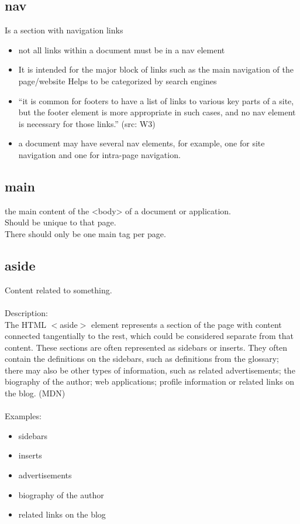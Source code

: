 \documentclass[]{article}
\newcommand{\<}{\guilsinglleft}
\renewcommand{\>}{\guilsinglright}
\begin{document}
\subsection{nav}
Is a section with navigation links
\begin{itemize}
	\item not all links within a document must be in a nav element
	
	\item It is intended for the major block of links
	\subitem such as the main navigation of the page/website
	\subitem Helps to be categorized by search engines
	
	\item “it is common for footers to have a list of links to various key parts of a site, but the footer element is more appropriate in such cases, and no nav element is necessary for those links.” (src: W3)
	
	\item a document may have several nav elements, for example, one for site navigation and one for intra-page navigation.
\end{itemize}

\subsection{main}
the main content of the <body> of a document or application.
\\
Should be unique to that page.
\\
There should only be one main tag per page.

\subsection{aside}
Content related to something.
\\\\
Description:
\\
The HTML $<$aside$>$ element represents a section of the page with content connected tangentially to the rest, which could be considered separate from that content. These sections are often represented as sidebars or inserts. They often contain the definitions on the sidebars, such as definitions from the glossary; there may also be other types of information, such as related advertisements; the biography of the author; web applications; profile information or related links on the blog. (MDN)
\\\\
Examples:
\begin{itemize}
	\item sidebars
	\item inserts
	\item advertisements
	\item biography of the author
	\item related links on the blog
\end{itemize}
\end{document}
